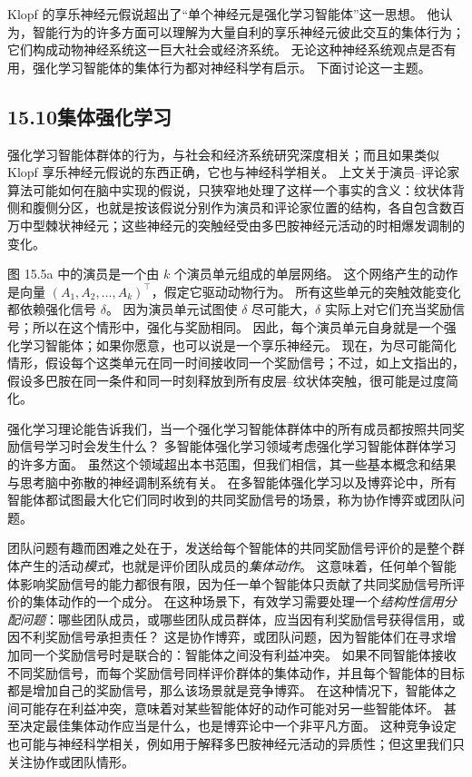 \documentclass[UTF8,12pt,a4paper,fontset=fandol]{ctexart}
\begin{document}
Klopf 的享乐神经元假说超出了“单个神经元是强化学习智能体”这一思想。
他认为，智能行为的许多方面可以理解为大量自利的享乐神经元彼此交互的集体行为；它们构成动物神经系统这一巨大社会或经济系统。
无论这种神经系统观点是否有用，强化学习智能体的集体行为都对神经科学有启示。
下面讨论这一主题。

\subsection*{15.10\quad 集体强化学习}

强化学习智能体群体的行为，与社会和经济系统研究深度相关；而且如果类似 Klopf 享乐神经元假说的东西正确，它也与神经科学相关。
上文关于演员--评论家算法可能如何在脑中实现的假说，只狭窄地处理了这样一个事实的含义：纹状体背侧和腹侧分区，也就是按该假说分别作为演员和评论家位置的结构，各自包含数百万中型棘状神经元；这些神经元的突触经受由多巴胺神经元活动的时相爆发调制的变化。

图 15.5a 中的演员是一个由 $k$ 个演员单元组成的单层网络。
这个网络产生的动作是向量 $(A_1,A_2,\ldots,A_k)^\top$，假定它驱动动物行为。
所有这些单元的突触效能变化都依赖强化信号 $\delta$。
因为演员单元试图使 $\delta$ 尽可能大，$\delta$ 实际上对它们充当奖励信号；所以在这个情形中，强化与奖励相同。
因此，每个演员单元自身就是一个强化学习智能体；如果你愿意，也可以说是一个享乐神经元。
现在，为尽可能简化情形，假设每个这类单元在同一时间接收同一个奖励信号；不过，如上文指出的，假设多巴胺在同一条件和同一时刻释放到所有皮层--纹状体突触，很可能是过度简化。

强化学习理论能告诉我们，当一个强化学习智能体群体中的所有成员都按照共同奖励信号学习时会发生什么？
多智能体强化学习领域考虑强化学习智能体群体学习的许多方面。
虽然这个领域超出本书范围，但我们相信，其一些基本概念和结果与思考脑中弥散的神经调制系统有关。
在多智能体强化学习以及博弈论中，所有智能体都试图最大化它们同时收到的共同奖励信号的场景，称为协作博弈或团队问题。

团队问题有趣而困难之处在于，发送给每个智能体的共同奖励信号评价的是整个群体产生的活动\textit{模式}，也就是评价团队成员的\textit{集体动作}。
这意味着，任何单个智能体影响奖励信号的能力都很有限，因为任一单个智能体只贡献了共同奖励信号所评价的集体动作的一个成分。
在这种场景下，有效学习需要处理一个\textit{结构性信用分配问题}：哪些团队成员，或哪些团队成员群体，应当因有利奖励信号获得信用，或因不利奖励信号承担责任？
这是协作博弈，或团队问题，因为智能体们在寻求增加同一个奖励信号时是联合的：智能体之间没有利益冲突。
如果不同智能体接收不同奖励信号，而每个奖励信号同样评价群体的集体动作，并且每个智能体的目标都是增加自己的奖励信号，那么该场景就是竞争博弈。
在这种情况下，智能体之间可能存在利益冲突，意味着对某些智能体好的动作可能对另一些智能体坏。
甚至决定最佳集体动作应当是什么，也是博弈论中一个非平凡方面。
这种竞争设定也可能与神经科学相关，例如用于解释多巴胺神经元活动的异质性；但这里我们只关注协作或团队情形。
\end{document}
